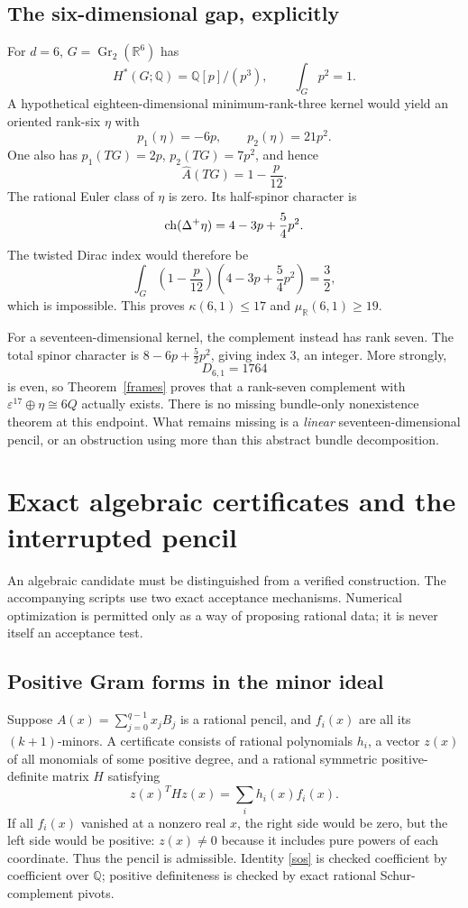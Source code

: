 \documentclass[11pt]{article}
\theoremstyle{remark}\newtheorem{remark}[theorem]{Remark}
\newcommand{\R}{\mathbb R}\newcommand{\C}{\mathbb C}\newcommand{\Q}{\mathbb Q}
\newcommand{\eps}{\varepsilon}\newcommand{\Gr}{\operatorname{Gr}}
\begin{document}
\subsection{The six-dimensional gap, explicitly}
For $d=6$, $G=\Gr_2(\R^6)$ has
\[
 H^*(G;\Q)=\Q[p]/(p^3),\qquad \int_Gp^2=1.
\]
A hypothetical eighteen-dimensional minimum-rank-three kernel would yield
an oriented rank-six $\eta$ with
\[
 p_1(\eta)=-6p,\qquad p_2(\eta)=21p^2.
\]
One also has $p_1(TG)=2p$, $p_2(TG)=7p^2$, and hence
\[
 \widehat A(TG)=1-\frac{p}{12}.
\]
The rational Euler class of $\eta$ is zero. Its half-spinor character is
\[
 \operatorname{ch}(\Delta^+\eta)=4-3p+\frac54p^2.
\]
The twisted Dirac index would therefore be
\[
 \int_G\left(1-\frac p{12}\right)
 \left(4-3p+\frac54p^2\right)=\frac32,
\]
which is impossible. This proves $\kappa(6,1)\le17$ and
$\mu_\R(6,1)\ge19$.

For a seventeen-dimensional kernel, the complement instead has rank seven.
The total spinor character is $8-6p+\tfrac52p^2$, giving index $3$, an
integer. More strongly,
\[
 D_{6,1}=1764
\]
is even, so Theorem~\ref{frames} proves that a rank-seven complement with
$\eps^{17}\oplus\eta\cong6Q$ actually exists. There is no missing
bundle-only nonexistence theorem at this endpoint. What remains missing is
a \emph{linear} seventeen-dimensional pencil, or an obstruction using more
than this abstract bundle decomposition.

\section{Exact algebraic certificates and the interrupted pencil}
An algebraic candidate must be distinguished from a verified construction.
The accompanying scripts use two exact acceptance mechanisms. Numerical
optimization is permitted only as a way of proposing rational data; it is
never itself an acceptance test.

\subsection{Positive Gram forms in the minor ideal}
Suppose $A(x)=\sum_{j=0}^{q-1}x_jB_j$ is a rational pencil, and $f_i(x)$
are all its $(k+1)$-minors. A certificate consists of rational polynomials
$h_i$, a vector $z(x)$ of all monomials of some positive degree, and a rational
symmetric positive-definite matrix $H$ satisfying
\begin{equation}\label{sos}
 z(x)^THz(x)=\sum_i h_i(x)f_i(x).
\end{equation}
If all $f_i(x)$ vanished at a nonzero real $x$, the right side would be zero,
but the left side would be positive: $z(x)\ne0$ because it includes pure
powers of each coordinate. Thus the pencil is admissible. Identity
\eqref{sos} is checked coefficient by coefficient over $\Q$; positive
definiteness is checked by exact rational Schur-complement pivots.
\end{document}
